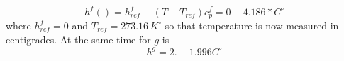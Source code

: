 \begin{equation}
h^f() = h^f_{ref} -(T-T_{ref})c_p^f = 0 - 4.186*  C^\circ   
\end{equation}
where \(h_{ref}^f=0\) and \(T_{ref} = 273.16\, K^\circ\) so that temperature is now measured in centigrades.
At the same time for \(g\) is 
\begin{equation}
h^g = 2.  - 1.996 C^\circ
\end{equation}